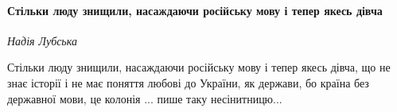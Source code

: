  
 
 
 
 
\paragraph{Стільки люду знищили, насаждаючи російську мову і тепер якесь дівча}

\emph{Надія Лубська}

Стільки люду знищили, насаждаючи російську мову і тепер якесь дівча, що не знає
історії і не має поняття любові до України, як держави, бо країна без державної
мови, це колонія ... пише таку несінитницю...

